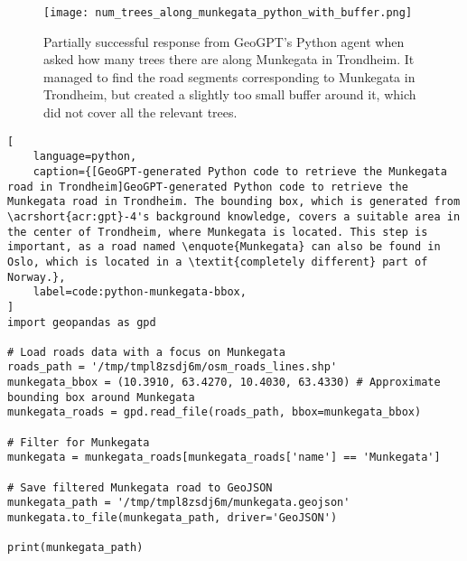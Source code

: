 \begin{figure}[htbp]
    \centering
    \texttt{[image: num\_trees\_along\_munkegata\_python\_with\_buffer.png]}
    \caption[Partially successful response from GeoGPT's Python agent when asked how many trees there are along Munkegata in Trondheim]{Partially successful response from GeoGPT's Python agent when asked how many trees there are along Munkegata in Trondheim. It managed to find the road segments corresponding to Munkegata in Trondheim, but created a slightly too small buffer around it, which did not cover all the relevant trees.}
    \label{fig:trees-along-munkegata-python-partial-success}
\end{figure}

\FloatBarrier

\begin{lstlisting}[
    language=python,
    caption={[GeoGPT-generated Python code to retrieve the Munkegata road in Trondheim]GeoGPT-generated Python code to retrieve the Munkegata road in Trondheim. The bounding box, which is generated from \acrshort{acr:gpt}-4's background knowledge, covers a suitable area in the center of Trondheim, where Munkegata is located. This step is important, as a road named \enquote{Munkegata} can also be found in Oslo, which is located in a \textit{completely different} part of Norway.},
    label=code:python-munkegata-bbox,
]
import geopandas as gpd

# Load roads data with a focus on Munkegata
roads_path = '/tmp/tmpl8zsdj6m/osm_roads_lines.shp'
munkegata_bbox = (10.3910, 63.4270, 10.4030, 63.4330) # Approximate bounding box around Munkegata
munkegata_roads = gpd.read_file(roads_path, bbox=munkegata_bbox)

# Filter for Munkegata
munkegata = munkegata_roads[munkegata_roads['name'] == 'Munkegata']

# Save filtered Munkegata road to GeoJSON
munkegata_path = '/tmp/tmpl8zsdj6m/munkegata.geojson'
munkegata.to_file(munkegata_path, driver='GeoJSON')

print(munkegata_path)
\end{lstlisting}

\FloatBarrier

